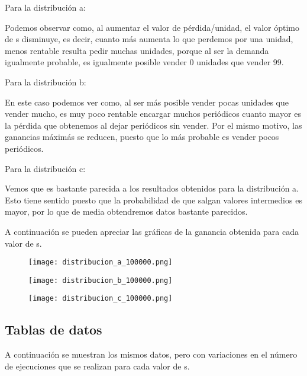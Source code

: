 Para la distribución a:

Podemos observar como, al aumentar el valor de pérdida/unidad, el valor óptimo de s disminuye, es decir, cuanto más aumenta lo que perdemos por una unidad, menos rentable resulta pedir muchas unidades, porque al ser la demanda igualmente probable, es igualmente posible vender 0 unidades que vender 99.

Para la distribución b:

En este caso podemos ver como, al ser más posible vender pocas unidades que vender mucho, es muy poco rentable encargar muchos periódicos cuanto mayor es la pérdida que obtenemos al dejar periódicos sin vender.
Por el mismo motivo, las ganancias máximás se reducen, puesto que lo más probable es vender pocos periódicos.

Para la distribución c:

Vemos que es bastante parecida a los resultados obtenidos para la distribución a. Esto tiene sentido puesto que la probabilidad de que salgan valores intermedios es mayor, por lo que de media obtendremos datos bastante parecidos.

\newpage

A continuación se pueden apreciar las gráficas de la ganancia obtenida para cada valor de s.


\begin{figure}[H]
	\centering
	\texttt{[image: distribucion\_a\_100000.png]}
\end{figure}
\begin{figure}[H]
	\centering
	\texttt{[image: distribucion\_b\_100000.png]}
\end{figure}
\begin{figure}[H]
	\centering
	\texttt{[image: distribucion\_c\_100000.png]}
\end{figure}



\subsection{Tablas de datos}
A continuación se muestran los mismos datos, pero con variaciones en el número de ejecuciones que se realizan para cada valor de s.

